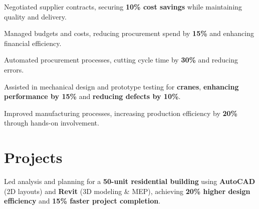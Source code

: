 \documentclass[]{deedy-resume-openfont}
\begin{document}
\begin{minipage}[t]{0.61\textwidth}
\begin{tightemize}
\item Negotiated supplier contracts, securing \textbf{10\% cost savings} while maintaining quality and delivery.
\item Managed budgets and costs, reducing procurement spend by \textbf{15\%} and enhancing financial efficiency.
\item Automated procurement processes, cutting cycle time by \textbf{30\%} and reducing errors.
\end{tightemize}
\sectionsep

\begin{tightemize}
\item Assisted in mechanical design and prototype testing for \textbf{cranes}, \textbf{enhancing performance by 15\%} and \textbf{reducing defects by 10\%}.
\item Improved manufacturing processes, increasing production efficiency by \textbf{20\%} through hands-on involvement.
\end{tightemize}
\sectionsep



\section{Projects}

\descript{}
Led analysis and planning for a \textbf{50-unit residential building} using \textbf{AutoCAD} (2D layouts) and \textbf{Revit} (3D modeling \& MEP), achieving \textbf{20\% higher design efficiency} and \textbf{15\% faster project completion}.
\sectionsep





\end{minipage}
\end{document}

